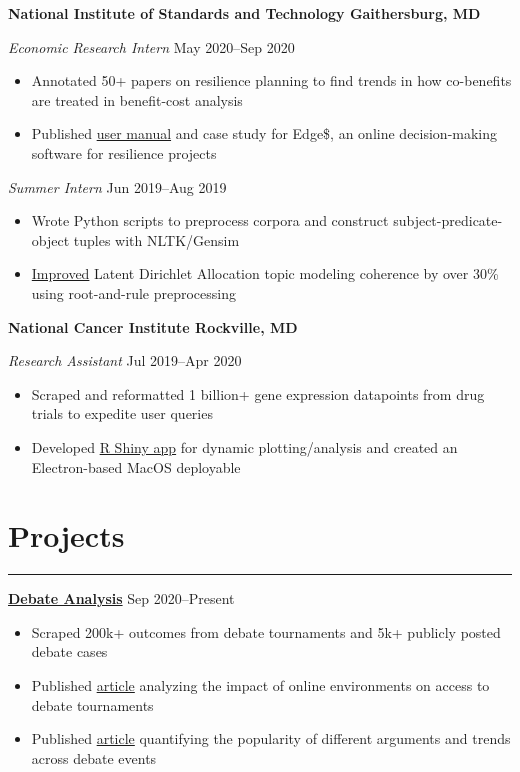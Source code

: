 \documentclass[11pt]{article}
\newcommand{\resumesection}[1]{\vspace{-0.6cm}\section*{\color{highlight}#1}\vspace{-0.3cm}\hrule\vspace{0.2cm}}
\begin{document}
\textbf{National Institute of Standards and Technology \hfill Gaithersburg, MD}\par

\textit{Economic Research Intern} \hfill May 2020--Sep 2020
\begin{itemize}
	\item Annotated 50+ papers on resilience planning to find trends in how co-benefits are treated in benefit-cost analysis
	\item Published \href{https://nvlpubs.nist.gov/nistpubs/SpecialPublications/NIST.SP.1260.pdf}{user manual} and case study for Edge\$, an online decision-making software for resilience projects
\end{itemize}\par

\textit{Summer Intern} \hfill Jun 2019--Aug 2019
\begin{itemize}
	\item Wrote Python scripts to preprocess corpora and construct subject-predicate-object tuples with NLTK/Gensim
	\item \href{https://github.com/petezh/RR-NLP-Tools}{Improved} Latent Dirichlet Allocation topic modeling coherence by over 30\% using root-and-rule preprocessing
\end{itemize}

\textbf{National Cancer Institute \hfill Rockville, MD}\par

\textit{Research Assistant} \hfill Jul 2019--Apr 2020 \par
\begin{itemize}
	\item Scraped and reformatted 1 billion+ gene expression datapoints from drug trials to expedite user queries
	\item Developed \href{https://github.com/petezh/TP-Workbench}{R Shiny app} for dynamic plotting/analysis and created an Electron-based MacOS deployable
\end{itemize}\vspace{0.1cm}

\resumesection{Projects}

\textbf{\href{https://github.com/petezh/E-Debate}{Debate Analysis}} \hfill Sep 2020--Present\par
\begin{itemize}
	\item Scraped 200k+ outcomes from debate tournaments and 5k+ publicly posted debate cases
	\item Published \href{https://www.vbriefly.com/2020/12/31/five-trends-among-e-debate-competitors-by-peter-zhang/}{article} analyzing the impact of online environments on access to debate tournaments
	\item Published \href{https://www.vbriefly.com/2021/01/22/disclosure-in-numbers-by-peter-zhang/}{article} quantifying the popularity of different arguments and trends across debate events
\end{itemize}\vspace{0.1cm} \par
\end{document}
